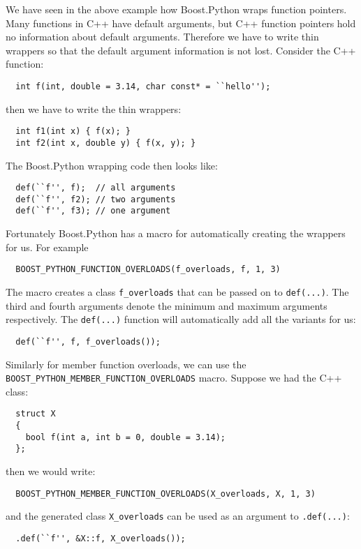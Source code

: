 We have seen in the above example how Boost.Python wraps function pointers. Many functions in C++ have default arguments, but C++ function pointers hold no information about default arguments. Therefore we have to write thin wrappers so that the default argument information is not lost. Consider the C++ function:
\begin{verbatim}
  int f(int, double = 3.14, char const* = ``hello'');
\end{verbatim}
then we have to write the thin wrappers:
\begin{verbatim}
  int f1(int x) { f(x); }
  int f2(int x, double y) { f(x, y); }
\end{verbatim}
The Boost.Python wrapping code then looks like:
\begin{verbatim}
  def(``f'', f);  // all arguments
  def(``f'', f2); // two arguments 
  def(``f'', f3); // one argument
\end{verbatim}
Fortunately Boost.Python has a macro for automatically creating the wrappers for us. For example
\begin{verbatim}
  BOOST_PYTHON_FUNCTION_OVERLOADS(f_overloads, f, 1, 3)
\end{verbatim}
The macro creates a class \verb|f_overloads| that can be passed on to \verb|def(...)|. The third and fourth arguments denote the minimum and maximum arguments respectively. The \verb|def(...)| function will automatically add all the variants for us:
\begin{verbatim}
  def(``f'', f, f_overloads());
\end{verbatim}
Similarly for member function overloads, we can use the \\
\verb|BOOST_PYTHON_MEMBER_FUNCTION_OVERLOADS| macro. Suppose we had the C++ class:
\begin{verbatim}
  struct X
  {
    bool f(int a, int b = 0, double = 3.14);
  };
\end{verbatim}
then we would write:
\begin{verbatim}
  BOOST_PYTHON_MEMBER_FUNCTION_OVERLOADS(X_overloads, X, 1, 3)
\end{verbatim}
and the generated class \verb|X_overloads| can be used as an argument to \verb|.def(...)|:
\begin{verbatim}
  .def(``f'', &X::f, X_overloads());
\end{verbatim}

